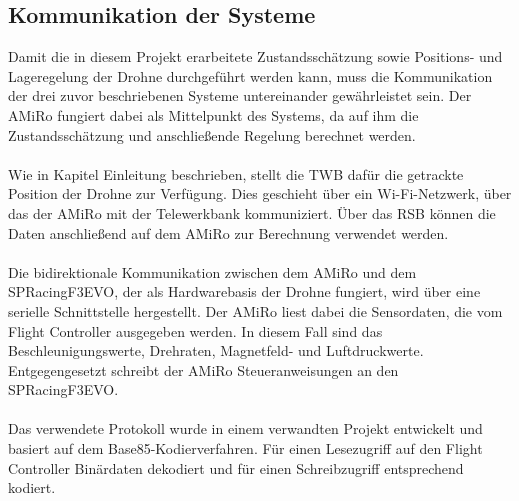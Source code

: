 \subsection{Kommunikation der Systeme}
Damit die in diesem Projekt erarbeitete Zustandsschätzung sowie Positions- und Lageregelung der Drohne durchgeführt werden kann, muss die Kommunikation der drei zuvor beschriebenen Systeme untereinander gewährleistet sein. Der AMiRo fungiert dabei als Mittelpunkt des Systems, da auf ihm die Zustandsschätzung und anschließende Regelung berechnet werden.\\\\
Wie in Kapitel Einleitung beschrieben, stellt die TWB dafür die getrackte Position der Drohne zur Verfügung. Dies geschieht über ein Wi-Fi-Netzwerk, über das der AMiRo mit der Telewerkbank kommuniziert. Über das RSB können die Daten anschließend auf dem AMiRo zur Berechnung verwendet werden.\\\\
Die bidirektionale Kommunikation zwischen dem AMiRo und dem SPRacingF3EVO, der als Hardwarebasis der Drohne fungiert, wird über eine serielle Schnittstelle hergestellt. Der AMiRo liest dabei die Sensordaten, die vom Flight Controller ausgegeben werden. In diesem Fall sind das Beschleunigungswerte, Drehraten, Magnetfeld- und Luftdruckwerte. Entgegengesetzt schreibt der AMiRo Steueranweisungen an den SPRacingF3EVO.\\\\
Das verwendete Protokoll wurde in einem verwandten Projekt entwickelt und basiert auf dem Base85-Kodierverfahren. Für einen Lesezugriff auf den Flight Controller Binärdaten dekodiert und für einen Schreibzugriff entsprechend kodiert.